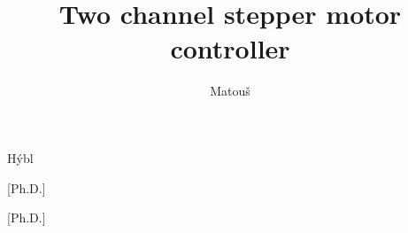 
\usepackage[
  english-czech,	%
%
  master,			  %
%
	center,			    %
%
]{thesis}   %


\author[Bc.]{Matouš}{Hýbl}


[Ph.D.]

[Ph.D.]

\title[Dvoukanálový kontrolér krokových motorů]{Two channel stepper motor controller}

